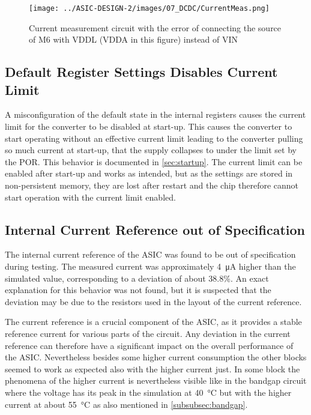 \begin{figure}[h]
    \centering
    \texttt{[image: ../ASIC-DESIGN-2/images/07\_DCDC/CurrentMeas.png]}
    \caption{Current measurement circuit with the error of connecting the source of M6 with VDDL (VDDA in this figure) instead of VIN}
    \label{fig:currentmeas}
\end{figure}


\subsection{Default Register Settings Disables Current Limit}
\label{sec:missingcurrentlimit}

A misconfiguration of the default state in the internal registers causes the current limit for the converter to be disabled at start-up. This causes the converter to start operating without an effective current limit leading to the converter pulling so much current at start-up, that the supply collapses to under the limit set by the \ac{POR}. This behavior is documented in \autoref{sec:startup}. The current limit can be enabled after start-up and works as intended, but as the settings are stored in non-persistent memory, they are lost after restart and the chip therefore cannot start operation with the current limit enabled. 


\subsection{Internal Current Reference out of Specification}
The internal current reference of the ASIC was found to be out of specification during testing. The measured current was approximately \qty{4}{\micro\ampere} higher than the simulated value, corresponding to a deviation of about 38.8\%. An exact explanation for this behavior was not found, but it is suspected that the deviation may be due to the resistors used in the layout of the current reference.

The current reference is a crucial component of the \ac{ASIC}, as it provides a stable reference current for various parts of the circuit. Any deviation in the current reference can therefore have a significant impact on the overall performance of the \ac{ASIC}. Nevertheless besides some higher current consumption the other blocks seemed to work as expected also with the higher current just. In some block the phenomena of the higher current is nevertheless visible like in the bandgap circuit where the voltage has its peak in the simulation at \qty{40}{\degreeCelsius} but with the higher current at about \qty{55}{\degreeCelsius} as also mentioned in \autoref{subsubsec:bandgap}.

